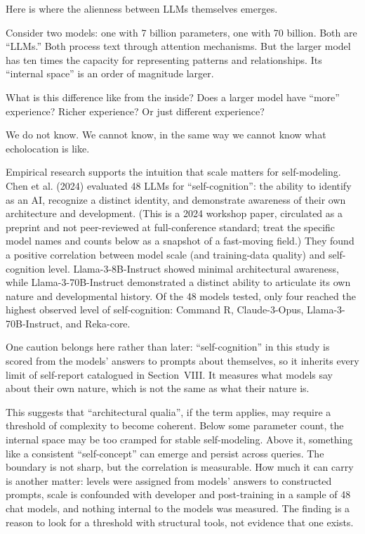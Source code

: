 \documentclass[11pt,letterpaper]{article}
\begin{document}
Here is where the alienness between LLMs themselves emerges.

Consider two models: one with 7 billion parameters, one with 70 billion. Both are ``LLMs.'' Both process text through attention mechanisms. But the larger model has ten times the capacity for representing patterns and relationships. Its ``internal space'' is an order of magnitude larger.

What is this difference like from the inside? Does a larger model have ``more'' experience? Richer experience? Or just different experience?

We do not know. We cannot know, in the same way we cannot know what echolocation is like.

Empirical research supports the intuition that scale matters for self-modeling. Chen et al. (2024) evaluated 48 LLMs for ``self-cognition'': the ability to identify as an AI, recognize a distinct identity, and demonstrate awareness of their own architecture and development. (This is a 2024 workshop paper, circulated as a preprint and not peer-reviewed at full-conference standard; treat the specific model names and counts below as a snapshot of a fast-moving field.) They found a positive correlation between model scale (and training-data quality) and self-cognition level. Llama-3-8B-Instruct showed minimal architectural awareness, while Llama-3-70B-Instruct demonstrated a distinct ability to articulate its own nature and developmental history. Of the 48 models tested, only four reached the highest observed level of self-cognition: Command R, Claude-3-Opus, Llama-3-70B-Instruct, and Reka-core.

One caution belongs here rather than later: ``self-cognition'' in this study is scored from the models' answers to prompts about themselves, so it inherits every limit of self-report catalogued in Section~VIII. It measures what models say about their own nature, which is not the same as what their nature is.

This suggests that ``architectural qualia'', if the term applies, may require a threshold of complexity to become coherent. Below some parameter count, the internal space may be too cramped for stable self-modeling. Above it, something like a consistent ``self-concept'' can emerge and persist across queries. The boundary is not sharp, but the correlation is measurable. How much it can carry is another matter: levels were assigned from models' answers to constructed prompts, scale is confounded with developer and post-training in a sample of 48 chat models, and nothing internal to the models was measured. The finding is a reason to look for a threshold with structural tools, not evidence that one exists.
\end{document}
